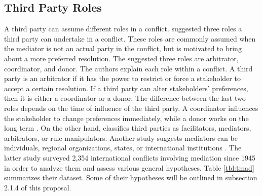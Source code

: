 \documentclass[letterpaper,12pt,titlepage,oneside,final]{book}
\begin{document}
\subsection{Third Party Roles}
\label{sec:tproles}
A third party can assume different roles in a conflict. \citet{sakamoto2005} suggested three roles a third party can undertake in a conflict. These roles are commonly assumed when the mediator is not an actual party in the conflict, but is motivated to bring about a more preferred resolution. The suggested three roles are arbitrator, coordinator, and donor. The authors explain each role within a conflict. A third party is an arbitrator if it has the power to restrict or force a stakeholder to accept a certain resolution. If a third party can alter stakeholders' preferences, then it is either a coordinator or a donor. The difference between the last two roles depends on the time of influence of the third party. A coordinator influences the stakeholder to change preferences immediately, while a donor works on the long term \citep{sakamoto2005}. On the other hand, \citet{raiffa1982} classifies third parties as facilitators, mediators, arbitrators, or rule manipulators. Another study suggests mediators can be individuals, regional organizations, states, or international institutions \citep{bercovitch2000,bercovitch2006}. The latter study surveyed 2,354 international conflicts involving mediation since 1945 in order to analyze them and assess various general hypotheses. Table \ref{tbl:tmad} summarizes their dataset. Some of their hypotheses will be outlined in subsection 2.1.4 of this proposal. 
\end{document}
